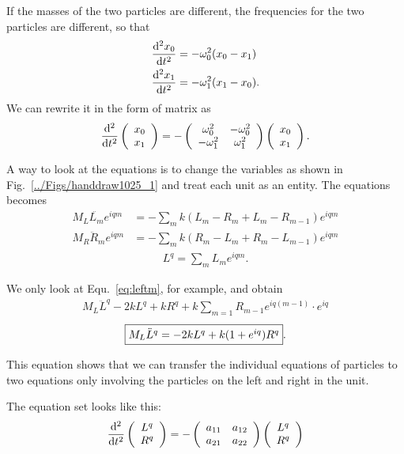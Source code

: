 If the masses of the two particles are different, the frequencies for the two particles are different, so that
\begin{align}
\frac{{\mathrm d}^2 {x_0}}{{\mathrm d}t^2}&=-\omega_0^2 (x_0-x_1)\\
\frac{{\mathrm d}^2 {x_1}}{{\mathrm d}t^2}&=-\omega_1^2 (x_1-x_0).
\end{align}
We can rewrite it in the form of matrix as 
\begin{equation}
\frac{{\mathrm d}^2 {}}{{\mathrm d}t^2}\left(\begin{array}{c}
x_0\\x_1
\end{array} \right) = -\left( \begin{array}{cc}
\omega_0^2 & -\omega_0^2\\
-\omega_1^2 & \omega_1^2
\end{array}  \right)
\left( \begin{array}{c}
x_0\\x_1
\end{array} \right).
\end{equation}

A way to look at the equations is to change the variables as shown in Fig.~\ref{../Figs/handdraw1025_1} and treat each unit as an entity. The equations becomes
\begin{align}
M_L \ddot{L_m} e^{iqm} &= -\sum_m k(L_m -R_m + L_m -R_{m-1}) e^{iqm} \label{eq:leftm}\\
{M}_R \ddot{R}_m e^{iqm} &= -\sum_m k (R_m -L_m+R_m -L_{m-1}) e^{iqm} \label{eq:rightm}
\end{align}
\begin{align}
L^q=\sum_m L_m e^{iqm}.
\end{align}

We only look at Equ.~\ref{eq:leftm}, for example, and obtain
\begin{align}
M_ L \ddot{L}^q -2kL^q + kR^q +k\sum_{m=1} R_{m-1}e^{iq(m-1)}\cdot e^{iq}
\end{align}
\begin{align}
\fbox{$M_L\ddot{L}^q=-2kL^q +k(1+e^{iq})R^q$}. 
\end{align}

This equation shows that we can  transfer the individual equations of particles to two equations only involving the particles on the left and right in the unit. 

The equation set looks like this:
\begin{align}
\frac{{\mathrm d}^2 {}}{{\mathrm d}t^2}\left(\begin{array}{c}
L^q\\ R^q
\end{array} \right) 
= - \left( \begin{array}{cc}
a_{11} & a_{12}\\
a_{21} & a_{22}
\end{array} \right)\left( \begin{array}{c}
L^q\\
R^q
\end{array} \right)
\end{align}

